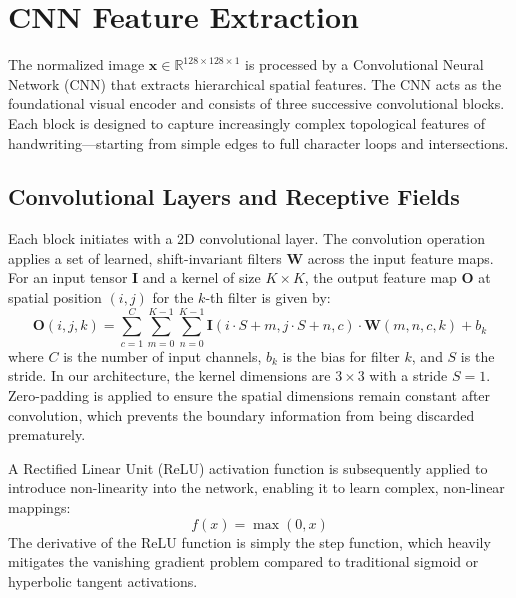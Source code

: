\section{CNN Feature Extraction}
The normalized image $\mathbf{x} \in \mathbb{R}^{128 \times 128 \times 1}$ is processed by a Convolutional Neural Network (CNN) that extracts hierarchical spatial features. The CNN acts as the foundational visual encoder and consists of three successive convolutional blocks. Each block is designed to capture increasingly complex topological features of handwriting—starting from simple edges to full character loops and intersections.

\subsection{Convolutional Layers and Receptive Fields}
Each block initiates with a 2D convolutional layer. The convolution operation applies a set of learned, shift-invariant filters $\mathbf{W}$ across the input feature maps. For an input tensor $\mathbf{I}$ and a kernel of size $K \times K$, the output feature map $\mathbf{O}$ at spatial position $(i, j)$ for the $k$-th filter is given by:
\begin{equation}
    \mathbf{O}(i, j, k) = \sum_{c=1}^C \sum_{m=0}^{K-1} \sum_{n=0}^{K-1} \mathbf{I}(i \cdot S + m, j \cdot S + n, c) \cdot \mathbf{W}(m, n, c, k) + b_k
\end{equation}
where $C$ is the number of input channels, $b_k$ is the bias for filter $k$, and $S$ is the stride. In our architecture, the kernel dimensions are $3 \times 3$ with a stride $S=1$. Zero-padding is applied to ensure the spatial dimensions remain constant after convolution, which prevents the boundary information from being discarded prematurely.

A Rectified Linear Unit (ReLU) activation function is subsequently applied to introduce non-linearity into the network, enabling it to learn complex, non-linear mappings:
\begin{equation}
    f(x) = \max(0, x)
\end{equation}
The derivative of the ReLU function is simply the step function, which heavily mitigates the vanishing gradient problem compared to traditional sigmoid or hyperbolic tangent activations.

